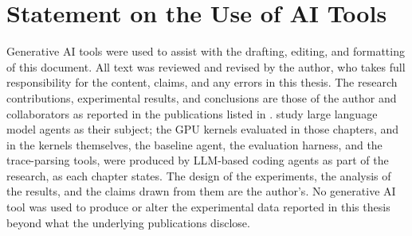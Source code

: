 \section{Statement on the Use of AI Tools}
\label{intro:sec:ai}

Generative AI tools were used to assist with the drafting, editing, and formatting of this document.
All text was reviewed and revised by the author, who takes full responsibility for the content, claims, and any errors in this thesis.
The research contributions, experimental results, and conclusions are those of the author and collaborators as reported in the publications listed in .
 study large language model agents as their subject; the GPU kernels evaluated in those chapters, and in  the kernels themselves, the baseline agent, the evaluation harness, and the trace-parsing tools, were produced by LLM-based coding agents as part of the research, as each chapter states.
The design of the experiments, the analysis of the results, and the claims drawn from them are the author's.
No generative AI tool was used to produce or alter the experimental data reported in this thesis beyond what the underlying publications disclose.
